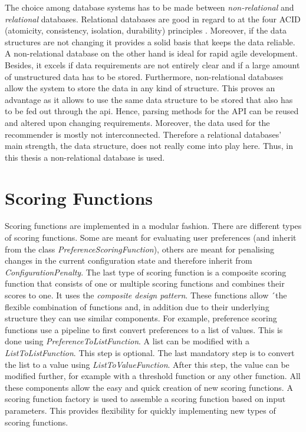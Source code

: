 The choice among database systems has to be made between \emph{non-relational} and \emph{relational} databases. Relational databases are good in regard to at the four ACID (atomicity, consistency, isolation, durability) principles \cite{chrysanthis1998recovery, cookACIDBASEDatabase2009}. Moreover, if the data structures are not changing it provides a solid basis that keeps the data reliable. A non-relational database on the other hand is ideal for rapid agile development. Besides, it excels if data requirements are not entirely clear and if a large amount of unstructured  data has to be stored. Furthermore, non-relational databases allow the system to store the data in any kind of structure. This proves an advantage as it allows to use the same data structure to be stored that also has to be fed out through the api. Hence, parsing methods for the API can be reused and altered upon changing requirements. Moreover, the data used for the recommender is mostly not interconnected. Therefore a relational databases' main strength, the data structure, does not really come into play here. Thus, in this thesis a non-relational database is used. 

\section{Scoring Functions}
\label{sec:DesignImplementation:ScroingFunctions}

Scoring functions are implemented in a modular fashion. There are different types of scoring functions. Some are meant for evaluating user preferences (and inherit from the class \emph{PreferenceScoringFunction}), others are meant for penalising changes in the current configuration state and therefore inherit from  \emph{ConfigurationPenalty}. The last type of scoring function is a composite scoring function that consists of one or multiple scoring functions and combines their scores to one. It uses the \emph{composite design pattern}. These functions allow ´the flexible combination of functions and, in addition due to their underlying structure they can use similar components. For example, preference scoring functions use a pipeline to first convert preferences to a list of values. This is done using \emph{PreferenceToListFunction}. A list can be modified with a \emph{ListToListFunction}. This step is optional. The last mandatory step is to convert the list to a value using \emph{ListToValueFunction}. After this step, the value can be modified further, for example with a threshold function or any other function. All these components allow the easy and quick creation of new scoring functions. A scoring function factory is used to assemble a scoring function based on input parameters. This provides flexibility for quickly implementing new types of scoring functions.

